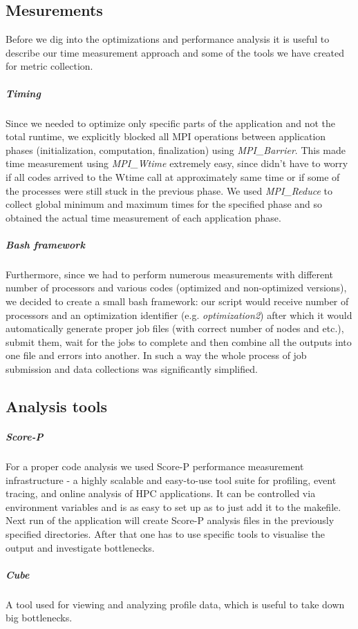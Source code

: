 \documentclass{article}
\begin{document}
\subsection{Mesurements}
Before we dig into the optimizations and performance analysis it is useful to describe our time measurement approach and some of the tools we have created for metric collection. 

\subparagraph{Timing}
Since we needed to optimize only specific parts of the application and not the total runtime, we explicitly blocked all MPI operations between application phases (initialization, computation, finalization) using \textit{MPI\_Barrier}. This made time measurement using \textit{MPI\_Wtime} extremely easy, since didn't have to worry if all codes arrived to the Wtime call at approximately same time or if some of the processes were still stuck in the previous phase. We used \textit{MPI\_Reduce} to collect global minimum and maximum times for the specified phase and so obtained the actual time measurement of each application phase.

\subparagraph{Bash framework}
Furthermore, since we had to perform numerous measurements with different number of processors and various codes (optimized and non-optimized versions), we decided to create a small bash framework: our script would receive number of processors and an optimization identifier (e.g. \textit{optimization2}) after which it would automatically generate proper job files (with correct number of nodes and etc.), submit them, wait for the jobs to complete and then combine all the outputs into one file and errors into another. In such a way the whole process of job submission and data collections was significantly simplified.

\subsection{Analysis tools}

\subparagraph{Score-P}
For a proper code analysis we used Score-P performance measurement infrastructure - a highly scalable and easy-to-use tool suite for profiling, event tracing, and online analysis of HPC applications. It can be controlled via environment variables and is as easy to set up as to just add it to the makefile. Next run of the application will create Score-P analysis files in the previously specified directories. After that one has to use specific tools to visualise the output and investigate bottlenecks.

\subparagraph{Cube}
A tool used for viewing and analyzing profile data, which is useful to take down big bottlenecks. 
\end{document}
